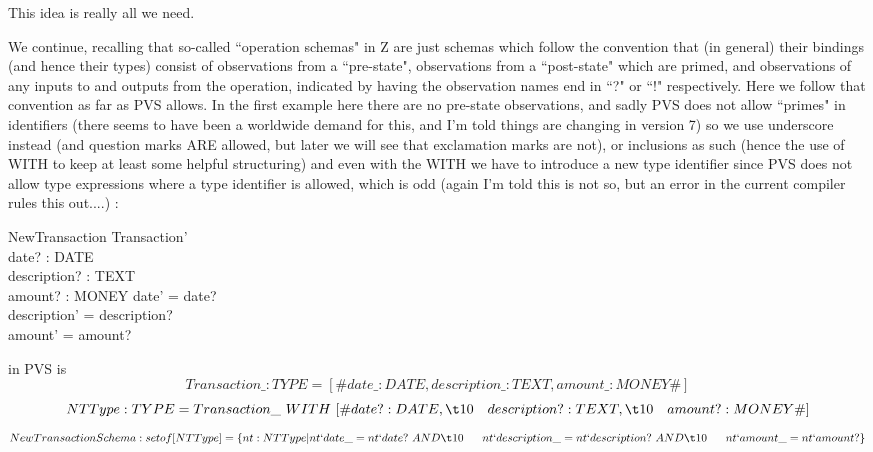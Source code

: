 \documentclass[11pt]{amsart}
\begin{document}
%
%

This idea is really all we need. 

We continue, recalling that so-called ``operation schemas" in Z are just schemas which follow the convention that (in general) their bindings (and hence their types) consist of observations from a ``pre-state", observations from a ``post-state" which are primed, and observations of any inputs to and outputs from the operation, indicated by having the observation names end in ``?" or ``!" respectively. Here we follow that convention as far as PVS allows. In the first example here there are no pre-state observations, and sadly PVS does not allow ``primes" in identifiers (there seems to have been a worldwide demand for this, and I'm told things are changing in version 7) so we use underscore instead (and question marks ARE allowed, but later we will see that exclamation marks are not), or inclusions as such (hence the use of WITH to keep at least some helpful structuring) and even with the WITH we have to introduce a new type identifier since PVS does not allow type expressions where a type identifier is allowed, which is odd (again I'm told this is not so, but an error in the current compiler rules this out....) :
\begin{schema}{NewTransaction}
Transaction'\\
date? : DATE\\
description? : TEXT\\
amount? : MONEY
\where
date' = date?\\
description' = description?\\
amount' = amount?
\end{schema}
in PVS is
\[
Transaction\_ : TYPE = [\# date\_ : DATE, description\_ : TEXT, amount\_ : MONEY \#]
\]
\[
NTType : TYPE = Transaction\_\ WITH\ [\# date? : DATE, \\
\t10 \ \ \  description? : TEXT, \\
\t10\ \  \ amount? : MONEY \#]
\]
\[
NewTransactionSchema : setof[NTType] = \{nt : NTType | nt`date\_ = nt`date?\ AND\\
 \t10       \ \ \   \     \                                 nt`description\_ = nt`description?\ AND\\
\t10		\ \ \ 	\	\	      nt`amount\_ = nt`amount? \}
\]
\end{document}
